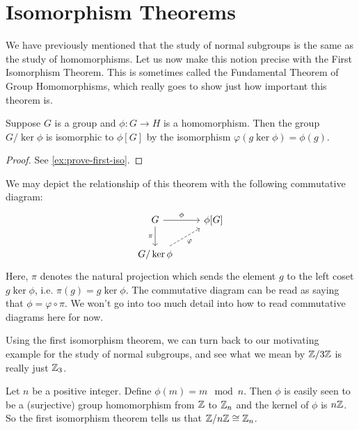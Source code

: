 \documentclass[./main.tex]{subfiles}
\begin{document}
\section{Isomorphism Theorems}

We have previously mentioned that the study of normal subgroups is the same as
the study of homomorphisms. Let us now make this notion precise with the First
Isomorphism Theorem. This is sometimes called the Fundamental Theorem of Group
Homomorphisms, which really goes to show just how important this theorem is.
\begin{theorem}
\label{thm:first-iso}
    Suppose $G$ is a group and $\phi: G \to H$ is a homomorphism. Then the group
    $G/\ker \phi$ is isomorphic to $\phi[G]$ by the isomorphism $\varphi(g \ker
    \phi) = \phi(g)$.
\end{theorem}
\begin{proof}
    See \cref{ex:prove-first-iso}.
\end{proof}
We may depict the relationship of this theorem with the following commutative diagram:
\[\begin{tikzcd}
	G & {\phi[G]} \\
	{G / \ker \phi}
	\arrow["\phi", from=1-1, to=1-2]
	\arrow["\pi"', from=1-1, to=2-1]
	\arrow["\varphi"', dashed, from=2-1, to=1-2]
\end{tikzcd}\] Here, $\pi$ denotes the natural projection which sends the
element $g$ to the left coset $g \ker \phi$, i.e. $\pi(g) = g \ker \phi$. The
commutative diagram can be read as saying that $\phi = \varphi \circ \pi$. We
won't go into too much detail into how to read commutative diagrams here for
now. 

Using the first isomorphism theorem, we can turn back to our motivating example
for the study of normal subgroups, and see what we mean by $\mathbb{Z} / 3 \mathbb{Z}$ is
really just $\mathbb{Z}_3$.

\begin{example}
    Let $n$ be a positive integer. Define $\phi(m) = m \mod n$. Then $\phi$ is
    easily seen to be a (surjective) group homomorphism from $\mathbb{Z}$ to $\mathbb{Z}_n$
    and the kernel of $\phi$ is $n \mathbb{Z}$. So the first isomorphism theorem tells
    us that $\mathbb{Z} / n \mathbb{Z} \cong \mathbb{Z}_n$.
\end{example}
\end{document}
